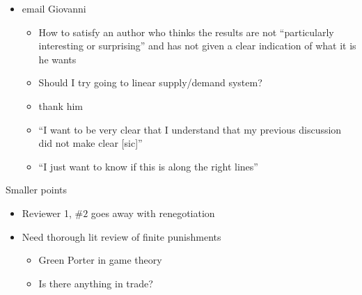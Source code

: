 \documentclass[12pt]{article}
\begin{document}
\begin{itemize}
	\item email Giovanni
		\begin{itemize}
			\item How to satisfy an author who thinks the results are not ``particularly interesting or surprising'' and has not given a clear indication of what it is he wants
			\item Should I try going to linear supply/demand system?
			\item thank him
			\item ``I want to be very clear that I understand that my previous discussion did not make clear [sic]''
			\item ``I just want to know if this is along the right lines''
		\end{itemize}
\end{itemize}

\vskip1in
Smaller points
\begin{itemize}
	\item Reviewer 1, $\#2$ goes away with renegotiation
	\item Need thorough lit review of finite punishments
		\begin{itemize}
			\item Green Porter in game theory
			\item Is there anything in trade?
		\end{itemize}
\end{itemize}
\end{document}
